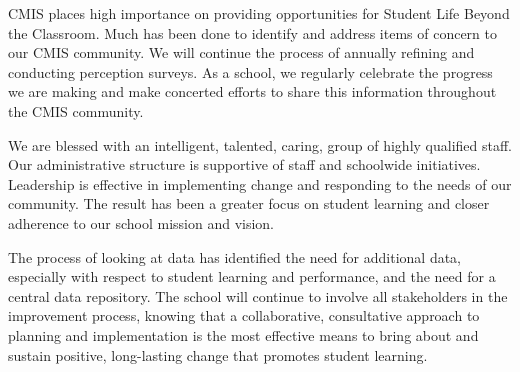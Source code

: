 CMIS places high importance on providing opportunities for Student Life Beyond the Classroom. Much has been done to identify and address items of concern to our CMIS community. We will continue the process of annually refining and conducting perception surveys. As a school, we regularly celebrate the progress we are making and make concerted efforts to share this information throughout the CMIS community. 

We are blessed with an intelligent, talented, caring, group of highly qualified staff. Our administrative structure is supportive of staff and schoolwide initiatives. Leadership is effective in implementing change and responding to the needs of our community. The result has been a greater focus on student learning and closer adherence to our school mission and vision. 

The process of looking at data has identified the need for additional data, especially with respect to student learning and performance, and the need for a central data repository. The school will continue to involve all stakeholders in the improvement process, knowing that a collaborative, consultative approach to planning and implementation is the most effective means to bring about and sustain positive, long-lasting change that promotes student learning. 
